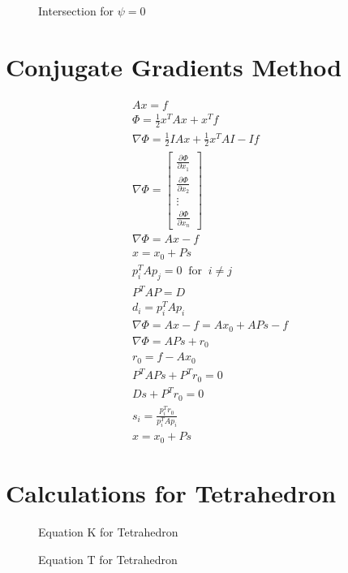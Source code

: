 \begin{figure}[H]
\centering

\caption{Intersection for $\psi = 0$}
\label{fig:levels}
\end{figure}

\section{Conjugate Gradients Method}

\begin{eqnarray}
A x = f \\
\Phi = \frac 1 2 x^T A x + x^T f \\
\nabla \Phi = \frac 1 2 I A x + \frac 1 2 x^T A I - I f \\
\nabla \Phi =
\begin{bmatrix}
\frac{\partial \Phi}{\partial x_1} \\
\frac{\partial \Phi}{\partial x_2} \\
\vdots \\
\frac{\partial \Phi}{\partial x_n}
\end{bmatrix} \\
\nabla \Phi = A x - f \\
x = x_0 + P s \\
p_i^T A p_j = 0\;\;\mbox{for}\;\;i \neq j \\
P^T A P = D \\
d_i = p_i^T A p_i \\
\nabla \Phi = A x - f = A x_0 + A P s - f \\
\nabla \Phi = A P s + r_0 \\
r_0 = f - A x_0 \\
P^T A P s + P^T r_0 = 0 \\
D s + P^T r_0 = 0 \\
s_i = \frac{p_i^T r_0}{p_i^T A p_i} \\
x = x_0 + P s
\end{eqnarray}

\section{Calculations for Tetrahedron}

\begin{figure}[H]
\centering

\caption{Equation K for Tetrahedron}
\label{eq:K}
\end{figure}

\begin{figure}[H]
\centering

\caption{Equation T for Tetrahedron}
\label{eq:T}
\end{figure}


